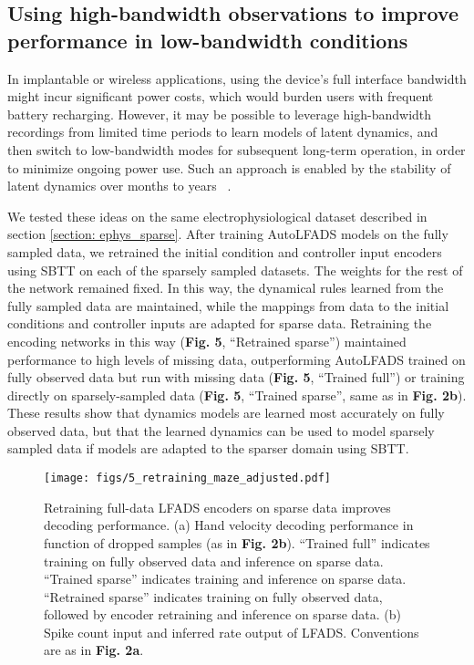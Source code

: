 \documentclass{article}
\begin{document}
\subsection{Using high-bandwidth observations to improve performance in low-bandwidth conditions}

In implantable or wireless applications, using the device's full interface bandwidth might incur significant power costs, which would burden users with frequent battery recharging. However, it may be possible to leverage high-bandwidth recordings from limited time periods to learn models of latent dynamics, and then switch to low-bandwidth modes for subsequent long-term operation, in order to minimize ongoing power use. Such an approach is enabled by the stability of latent dynamics over months to years ~\cite{pandarinath2018inferring,kao2017leveraging,gallego2020long}. 

We tested these ideas on the same electrophysiological dataset described in section \ref{section: ephys_sparse}. After training AutoLFADS models on the fully sampled data, we retrained the initial condition and controller input encoders using SBTT on each of the sparsely sampled datasets. The weights for the rest of the network remained fixed. In this way, the dynamical rules learned from the fully sampled data are maintained, while the mappings from data to the initial conditions and controller inputs are adapted for sparse data. Retraining the encoding networks in this way (\textbf{Fig. 5}, “Retrained sparse”) maintained performance to high levels of missing data, outperforming AutoLFADS trained on fully observed data but run with missing data (\textbf{Fig. 5}, “Trained full”) or training directly on sparsely-sampled data (\textbf{Fig. 5}, “Trained sparse”, same as in \textbf{Fig. 2b}). These results show that dynamics models are learned most accurately on fully observed data, but that the learned dynamics can be used to model sparsely sampled data if models are adapted to the sparser domain using SBTT.

\begin{figure}
  \centering
  \texttt{[image: figs/5\_retraining\_maze\_adjusted.pdf]}
  \caption{Retraining full-data LFADS encoders on sparse data improves decoding performance. (a) Hand velocity decoding performance in function of dropped samples (as in \textbf{Fig. 2b}). “Trained full” indicates training on fully observed data and inference on sparse data. “Trained sparse” indicates training and inference on sparse data. “Retrained sparse” indicates training on fully observed data, followed by encoder retraining and inference on sparse data. (b) Spike count input and inferred rate output of LFADS. Conventions are as in \textbf{Fig. 2a}.}
  \label{fig:retraining}
\end{figure}
\end{document}
